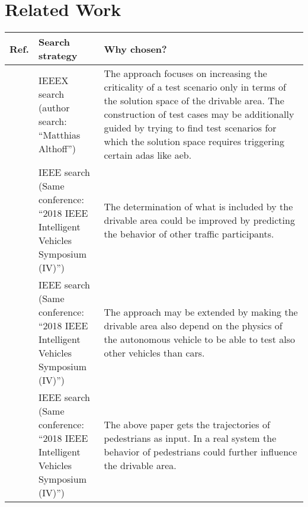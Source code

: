 \documentclass[oneside, notitlepage, twocolumn]{scrartcl}
\newcommand{\tableheadline}[1]{\textbf{#1}}
\begin{document}
\section{Related Work}
\begin{adjustbox}{angle=90}
\begin{tabularx}{\textwidth}{llX}
    \tableheadline{Ref.} & \tableheadline{Search strategy} & \tableheadline{Why chosen?}\\
    \midrule
    \cite{evasiveManeuvers} & \makecell{IEEEX search\\(author search:\\``Matthias Althoff'')} & The approach focuses on increasing the criticality of a test scenario only in terms of the solution space of the drivable area.
    The construction of test cases may be additionally guided by trying to find test scenarios for which the solution space requires triggering certain \gls{adas} like \gls{aeb}.\\
    \midrule
    \cite{prediction} & \makecell{IEEE search\\(Same conference:\\``2018 IEEE Intelligent\\Vehicles Symposium (IV)'')}& The determination of what is included by the drivable area could be improved by predicting the behavior of other traffic participants.\\
    \midrule
    \cite{dynamicLimitation} & \makecell{IEEE search\\(Same conference:\\``2018 IEEE Intelligent\\Vehicles Symposium (IV)'')}& The approach may be extended by making the drivable area also depend on the physics of the autonomous vehicle to be able to test also other vehicles than cars.\\
    \midrule
    \cite{bodyLanguage} & \makecell{IEEE search\\(Same conference:\\``2018 IEEE Intelligent\\Vehicles Symposium (IV)'')} & The above paper gets the trajectories of pedestrians as input.
    In a real system the behavior of pedestrians could further influence the drivable area.\\
\end{tabularx}
\end{adjustbox}
\end{document}
